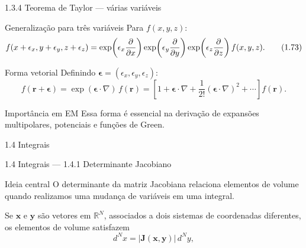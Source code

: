 \documentclass[aspectratio=169]{beamer}
\newcommand{\blue}[1]{\textcolor{myblue}{#1}}
\begin{document}
\begin{frame}{1.3.4 Teorema de Taylor — várias variáveis}
\begin{block}{Generalização para três variáveis}
Para $f(x,y,z)$:
\begin{equation}
f(x+\epsilon_x,y+\epsilon_y,z+\epsilon_z)
=
\exp\!\left(\epsilon_x\pdv{}{x}\right)
\exp\!\left(\epsilon_y\pdv{}{y}\right)
\exp\!\left(\epsilon_z\pdv{}{z}\right)
f(x,y,z).
\tag{1.73}
\label{eq:taylor_xyz}
\end{equation}
\end{block}

\begin{block}{Forma vetorial}
Definindo $\bm\epsilon=(\epsilon_x,\epsilon_y,\epsilon_z)$:
\begin{equation}
f(\bm r+\bm\epsilon)
=
\exp(\bm\epsilon\cdot\nabla)\,f(\bm r)
=
\left[
1
+\bm\epsilon\cdot\nabla
+\frac{1}{2!}(\bm\epsilon\cdot\nabla)^2
+\cdots
\right] f(\bm r).
\tag{1.74}
\label{eq:taylor_vector}
\end{equation}
\end{block}

\begin{alertblock}{Importância em EM}
Essa forma é essencial na derivação de expansões multipolares,
potenciais e funções de Green.
\end{alertblock}
\end{frame}

\begin{frame}[plain]
\centering
\vfill
{\Huge\blue{1.4 Integrais}}
\vfill
\end{frame}

\begin{frame}{1.4 Integrais — 1.4.1 Determinante Jacobiano}
\begin{block}{Ideia central}
O determinante da matriz Jacobiana relaciona \blue{elementos de volume}
quando realizamos uma mudança de variáveis em uma integral.
\end{block}

Se $\bm x$ e $\bm y$ são vetores em $\mathbb{R}^N$, associados a dois sistemas
de coordenadas diferentes, os elementos de volume satisfazem
\begin{equation}
d^N x = \left| \mathbf J(\bm x,\bm y) \right|\, d^N y,
\tag{1.75}
\label{eq:jacobian_general}
\end{equation}
\end{frame}
\end{document}
